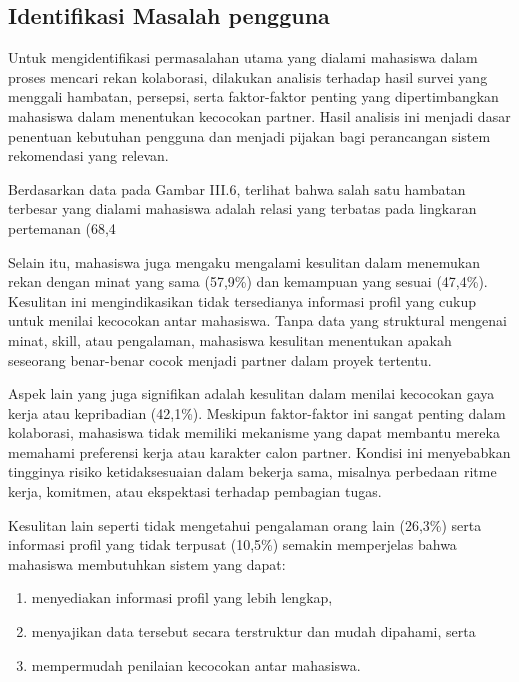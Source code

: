 \subsection{Identifikasi Masalah pengguna}
Untuk mengidentifikasi permasalahan utama yang dialami mahasiswa dalam proses mencari rekan kolaborasi, dilakukan analisis terhadap hasil survei yang menggali hambatan, persepsi, serta faktor-faktor penting yang dipertimbangkan mahasiswa dalam menentukan kecocokan partner. Hasil analisis ini menjadi dasar penentuan kebutuhan pengguna dan menjadi pijakan bagi perancangan sistem rekomendasi yang relevan.

Berdasarkan data pada Gambar III.6, terlihat bahwa salah satu hambatan terbesar yang dialami mahasiswa adalah relasi yang terbatas pada lingkaran pertemanan (68,4%

Selain itu, mahasiswa juga mengaku mengalami kesulitan dalam menemukan rekan dengan minat yang sama (57,9\%) dan kemampuan yang sesuai (47,4\%). Kesulitan ini mengindikasikan tidak tersedianya informasi profil yang cukup untuk menilai kecocokan antar mahasiswa. Tanpa data yang struktural mengenai minat, skill, atau pengalaman, mahasiswa kesulitan menentukan apakah seseorang benar-benar cocok menjadi partner dalam proyek tertentu.

Aspek lain yang juga signifikan adalah kesulitan dalam menilai kecocokan gaya kerja atau kepribadian (42,1\%). Meskipun faktor-faktor ini sangat penting dalam kolaborasi, mahasiswa tidak memiliki mekanisme yang dapat membantu mereka memahami preferensi kerja atau karakter calon partner. Kondisi ini menyebabkan tingginya risiko ketidaksesuaian dalam bekerja sama, misalnya perbedaan ritme kerja, komitmen, atau ekspektasi terhadap pembagian tugas.

Kesulitan lain seperti tidak mengetahui pengalaman orang lain (26,3\%) serta informasi profil yang tidak terpusat (10,5\%) semakin memperjelas bahwa mahasiswa membutuhkan sistem yang dapat:
\begin{enumerate}
\item {menyediakan informasi profil yang lebih lengkap,} 
\item {menyajikan data tersebut secara terstruktur dan mudah dipahami, serta}
\item {mempermudah penilaian kecocokan antar mahasiswa.}
\end{enumerate}

